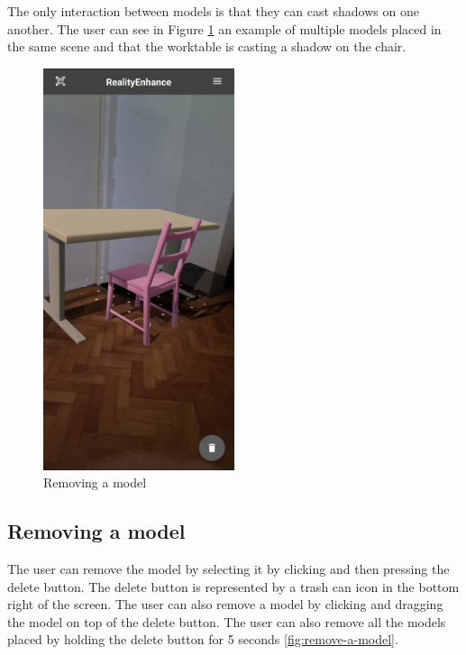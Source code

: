 The only interaction between models is that they can cast shadows on one another. The user can see in Figure \ref{fig:multiple-models} an example of multiple models placed in the same scene and that the worktable is casting a shadow on the chair.

\begin{figure}[ht]
    \begin{center}
        \includegraphics[width=0.5\textwidth]{img/App_screenshots/Multiple-models.jpg}
        \caption{Removing a model}
        \label{fig:multiple-models}
    \end{center}
\end{figure}
\pagebreak

\subsection{Removing a model}
The user can remove the model by selecting it by clicking and then pressing the delete button. The delete button is represented by a trash can icon in the bottom right of the screen. The user can also remove a model by clicking and dragging the model on top of the delete button. The user can also remove all the models placed by holding the delete button for 5 seconds \ref{fig:remove-a-model}.

